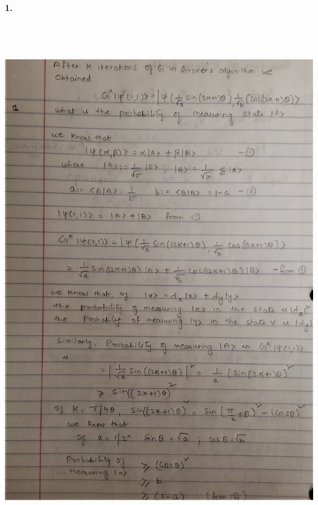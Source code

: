 \documentclass [12pt]{article}
\theoremstyle{definition}
\begin{document}
{\bf 1.} \\
\includegraphics[width=18cm, height=23cm]{I22}

\newpage
\end{document}
